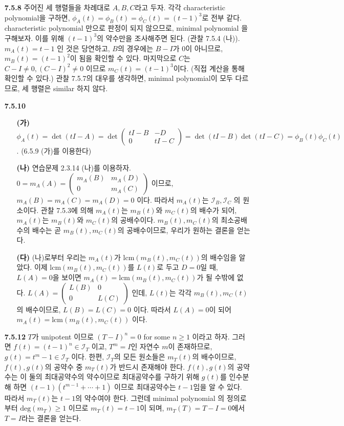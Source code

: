 \documentclass{article}
\begin{document}
\begin{itemize}
\item[\textbf{7.5.8}] 주어진 세 행렬들을 차례대로 $A, B, C$라고 두자. 각각 characteristic polynomial을 구하면, $\phi_A(t) = \phi_B(t) = \phi_C(t) =  (t-1)^3$로 전부 같다. characteristic polynomial 만으로 판정이 되지 않으므로, minimal polynomial 을 구해보자. 이를 위해 $(t-1)^3$의 약수만을 조사해주면 된다. (관찰 7.5.4 (나)). \\ $m_A(t) = t-1$ 인 것은 당연하고, $B$의 경우에는 $B-I$가 $0$이 아니므로, $m_B(t) = (t-1)^2$이 됨을 확인할 수 있다. 마지막으로 $C$는 $C-I \neq 0, (C-I)^2 \neq 0$ 이므로 $m_C(t) = (t-1)^3$이다. (직접 계산을 통해 확인할 수 있다.) 관찰 7.5.7의 대우를 생각하면, minimal polynomial이 모두 다르므로, 세 행렬은 similar 하지 않다.

\item[\textbf{7.5.10}]
	\begin{itemize}
		\item[\textbf{(가)}] $\phi_A(t) = \det(tI - A) = \det
		\begin{pmatrix}
			tI - B & -D \\
			0 & tI-C
		\end{pmatrix} = \det(tI-B)\det(tI-C) = \phi_B(t)\phi_C(t)$. (6.5.9 (가)를 이용한다)
		\item[\textbf{(나)}] 연습문제 2.3.14 (나)를 이용하자. $0 = m_A(A) = \begin{pmatrix}m_A(B)& m_A(D) \\ 0 & m_A(C)\end{pmatrix}$ 이므로,\\ $m_A(B) = m_A(C) = m_A(D) = 0$ 이다. 따라서 $m_A(t)$는 $\mathcal{I}_B, \mathcal{I}_C$ 의 원소이다. 관찰 7.5.3에 의해 $m_A(t)$는 $m_B(t)$와 $m_C(t)$의 배수가 되어, $m_A(t)$는 $m_B(t)$와 $m_C(t)$의 공배수이다. $m_B(t), m_C(t)$의 최소공배수의 배수는 곧 $m_B(t), m_C(t)$의 공배수이므로, 우리가 원하는 결론을 얻는다.
		\item[\textbf{(다)}] (나)로부터 우리는 $m_A(t)$가 $\text{lcm}(m_B(t), m_C(t))$의 배수임을 알았다. 이제 $\text{lcm}(m_B(t), m_C(t))$를 $L(t)$로 두고 $D = 0$일 때, $L(A) = 0$을 보이면 $m_A(t) = \text{lcm}(m_B(t), m_C(t))$가 될 수밖에 없다. 
		$L(A) = \begin{pmatrix}L(B)& 0 \\ 0 & L(C)\end{pmatrix}$ 인데, $L(t)$는 각각 $m_B(t), m_C(t)$의 배수이므로, $L(B) = L(C) = 0$ 이다. 따라서 $L(A)=0$이 되어 $m_A(t) = \text{lcm}(m_B(t), m_C(t))$ 이다.
	\end{itemize}

\item[\textbf{7.5.12}] $T$가 unipotent 이므로 $(T-I)^n =0$ for some $n\geq 1$ 이라고 하자. 그러면 $f(t) = (t-1)^n \in \mathcal{I}_{T}$ 이고, $T^m=I$인 자연수 $m$이 존재하므로, $g(t) = t^m-1 \in \mathcal{I}_{T}$ 이다. 한편, $\mathcal{I}_T$의 모든 원소들은 $m_T(t)$의 배수이므로, $f(t), g(t)$의 공약수 중 $m_T(t)$가 반드시 존재해야 한다. $f(t), g(t)$의 공약수는 이 둘의 최대공약수의 약수이므로 최대공약수를 구하기 위해 $g(t)$를 인수분해 하면 $(t-1)(t^{m-1}+\cdots+1)$ 이므로 최대공약수는 $t-1$임을 알 수 있다. 따라서 $m_T(t)$는 $t-1$의 약수여야 한다. 그런데 minimal polynomial 의 정의로부터 $\text{deg}(m_T) \geq 1$ 이므로 $m_T(t) = t-1$이 되며, $m_T(T) = T - I = 0$에서 $T=I$라는 결론을 얻는다.


\end{itemize}
\end{document}
